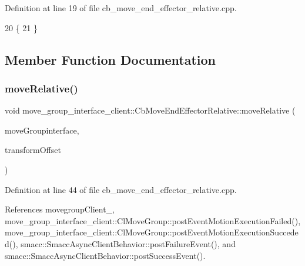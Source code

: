 Definition at line 19 of file cb\+\_\+move\+\_\+end\+\_\+effector\+\_\+relative.\+cpp.


\begin{DoxyCode}
20     \{
21     \}
\end{DoxyCode}


\subsection{Member Function Documentation}
\mbox{\label{classmove__group__interface__client_1_1CbMoveEndEffectorRelative_a8f64d14c4a398b455b1953ae61cc58bc}} 
\subsubsection{\texorpdfstring{move\+Relative()}{moveRelative()}}
{\footnotesize\ttfamily void move\+\_\+group\+\_\+interface\+\_\+client\+::\+Cb\+Move\+End\+Effector\+Relative\+::move\+Relative (\begin{DoxyParamCaption}\item[{moveit\+::planning\+\_\+interface\+::\+Move\+Group\+Interface \&}]{move\+Groupinterface,  }\item[{geometry\+\_\+msgs\+::\+Transform \&}]{transform\+Offset }\end{DoxyParamCaption})\hspace{0.3cm}{\ttfamily [protected]}}



Definition at line 44 of file cb\+\_\+move\+\_\+end\+\_\+effector\+\_\+relative.\+cpp.



References movegroup\+Client\+\_\+, move\+\_\+group\+\_\+interface\+\_\+client\+::\+Cl\+Move\+Group\+::post\+Event\+Motion\+Execution\+Failed(), move\+\_\+group\+\_\+interface\+\_\+client\+::\+Cl\+Move\+Group\+::post\+Event\+Motion\+Execution\+Succeded(), smacc\+::\+Smacc\+Async\+Client\+Behavior\+::post\+Failure\+Event(), and smacc\+::\+Smacc\+Async\+Client\+Behavior\+::post\+Success\+Event().



